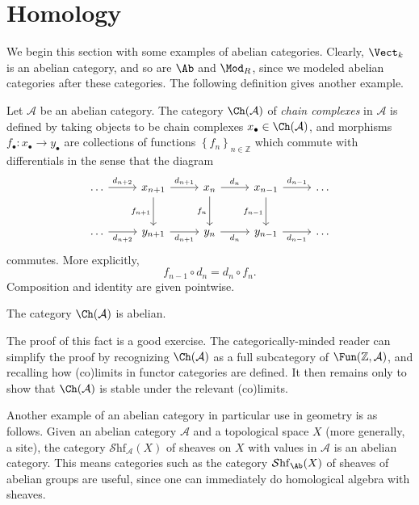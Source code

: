 \section{Homology}

We begin this section with some examples of abelian categories. Clearly, $\Vect_{k} $ is an abelian category, and so are $\Ab $ and $\Mod_R$, since we modeled abelian categories after these categories. The following definition gives another example.

\begin{definition}\label{5.1}
	Let $\mathcal{A} $ be an abelian category. The category $\Ch(\mathcal{A} ) $ of \emph{chain complexes} in $\mathcal{A} $ is defined by taking objects to be chain complexes $x_{\bullet} \in \Ch(\mathcal{A} ) $, and morphisms $f_{\bullet} : x_{\bullet}  \to y_{\bullet} $ are collections of functions $\left\{ f_n \right\}_{n\in\mathbb{Z} } $ which commute with differentials in the sense that the diagram
	\[\begin{tikzcd}[row sep = 2.5em, column sep = 2.5em]
	\ldots \ar[" d_{n+2}  ", r]  & x_{n+1} \ar[" d_{n+1}  ", r] \ar[" f_{n+1}  "', d]  & x_n \ar[" d_n ", r] \ar[" f_n "', d]  & x_{n-1} \ar[" d_{n-1}  ", r] \ar[" f_{n-1}  "', d]  & \ldots  \\
	\ldots \ar[" d_{n+2}  "', r]  & y_{n+1} \ar[" d_{n+1}  "', r]  & y_n \ar[" d_n "', r]  & y_{n-1} \ar[" d_{n-1}  "', r]  & \ldots 
	\end{tikzcd}\]
	commutes. More explicitly,
	\[
		f_{n-1} \circ d_{n} =d_{n} \circ f_{n} 
	.\]
	Composition and identity are given pointwise.
\end{definition}

\begin{proposition}\label{5.2}
	The category $\Ch(\mathcal{A} ) $ is abelian.
\end{proposition}
The proof of this fact is a good exercise. The categorically-minded reader can simplify the proof by recognizing $\Ch(\mathcal{A} ) $ as a full subcategory of $\Fun(\mathbb{Z} ,\mathcal{A} )$, and recalling how (co)limits in functor categories are defined. It then remains only to show that $\Ch(\mathcal{A} ) $ is stable under the relevant (co)limits.

Another example of an abelian category in particular use in geometry is as follows. Given an abelian category $\mathcal{A} $ and a topological space $X$ (more generally, a site), the category $\mathcal{S} \mathrm{hf}_\mathcal{A} (X)$ of sheaves on $X$ with values in $\mathcal{A} $ is an abelian category. This means categories such as the category $\mathcal{S} \mathrm{hf} _{\Ab } (X)$ of sheaves of abelian groups are useful, since one can immediately do homological algebra with sheaves.

